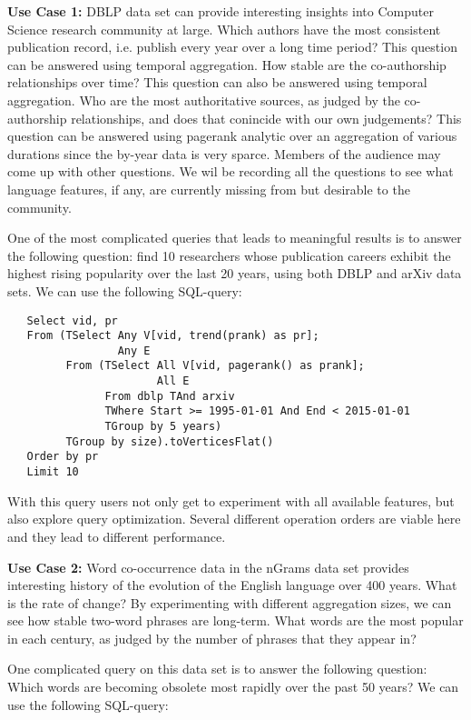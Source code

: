 {\bf Use Case 1:} DBLP data set can provide interesting insights into
Computer Science research community at large.  Which authors have the
most consistent publication record, i.e. publish every year over a
long time period? This question can be answered using temporal
aggregation.  How stable are the co-authorship relationships over
time? This question can also be answered using temporal aggregation.
Who are the most authoritative sources, as judged by the co-authorship
relationships, and does that conincide with our own judgements?  This
question can be answered using pagerank analytic over an aggregation
of various durations since the by-year data is very sparce.  Members
of the audience may come up with other questions.  We wil be recording
all the questions to see what language features, if any, are currently
missing from \ql but desirable to the community.

One of the most complicated queries that leads to meaningful results
is to answer the following question: find 10 researchers whose
publication careers exhibit the highest rising popularity over the
last 20 years, using both DBLP and arXiv data sets.  We can use the
following SQL-\ql query:

\begin{small}
\begin{verbatim}
   Select vid, pr
   From (TSelect Any V[vid, trend(prank) as pr];
                 Any E
         From (TSelect All V[vid, pagerank() as prank]; 
                       All E
               From dblp TAnd arxiv
               TWhere Start >= 1995-01-01 And End < 2015-01-01
               TGroup by 5 years)
         TGroup by size).toVerticesFlat()
   Order by pr
   Limit 10
\end{verbatim}
\end{small}

With this query users not only get to experiment with all available
\ql features, but also explore query optimization.  Several different
operation orders are viable here and they lead to different
performance.

{\bf Use Case 2:} Word co-occurrence data in the nGrams data set
provides interesting history of the evolution of the English language
over 400 years.  What is the rate of change?  By experimenting with
different aggregation sizes, we can see how stable two-word phrases
are long-term.  What words are the most popular in each century, as
judged by the number of phrases that they appear in?  

One complicated query on this data set is to answer the following
question: Which words are becoming obsolete most rapidly over the past
50 years?  We can use the following SQL-\ql query:

